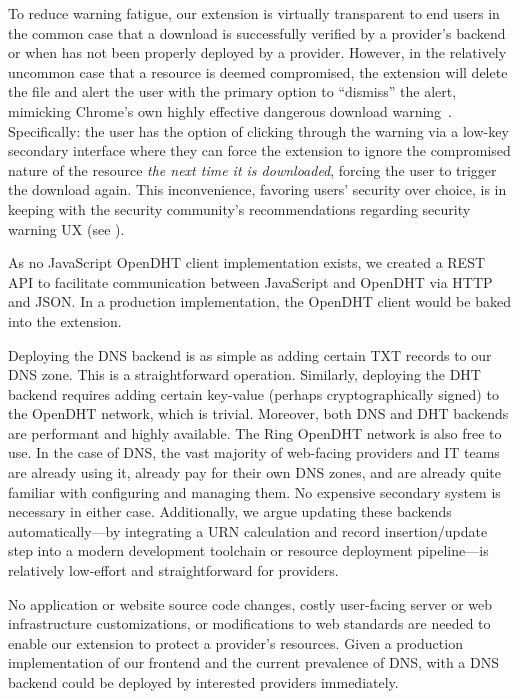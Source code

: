 To reduce warning fatigue, our extension is virtually transparent to end users
in the common case that a download is successfully verified by a provider's
backend or when \SYSTEM{} has not been properly deployed by a provider. However,
in the relatively uncommon case that a resource is deemed compromised, the
extension will delete the file and alert the user with the primary option to
``dismiss'' the alert, mimicking Chrome's own highly effective dangerous
download warning~\cite{ChromeClickThrough}. Specifically: the user has the
option of clicking through the warning via a low-key secondary interface where
they can force the extension to ignore the compromised nature of the resource
\emph{the next time it is downloaded}, forcing the user to trigger the download
again. This inconvenience, favoring users' security over choice, is in keeping
with the security community's recommendations regarding security warning UX (see
).

As no JavaScript OpenDHT client implementation exists, we created a REST API to
facilitate communication between JavaScript and OpenDHT via HTTP and JSON. In a
production implementation, the OpenDHT client would be baked into the extension.

Deploying the DNS backend is as simple as adding certain TXT records to our DNS
zone. This is a straightforward operation. Similarly, deploying the DHT backend
requires adding certain key-value (perhaps cryptographically signed) to the
OpenDHT network, which is trivial. Moreover, both DNS and DHT backends are
performant and highly available. The Ring OpenDHT network is also free to use.
In the case of DNS, the vast majority of web-facing providers and IT teams are
already using it, already pay for their own DNS zones, and are already quite
familiar with configuring and managing them. No expensive secondary system is
necessary in either case. Additionally, we argue updating these backends
automatically---by integrating a URN calculation and record insertion/update
step into a modern development toolchain or resource deployment pipeline---is
relatively low-effort and straightforward for providers.

No application or website source code changes, costly user-facing server or web
infrastructure customizations, or modifications to web standards are needed to
enable our extension to protect a provider's resources. Given a production
implementation of our frontend and the current prevalence of DNS, \SYSTEM{} with
a DNS backend could be deployed by interested providers immediately.

